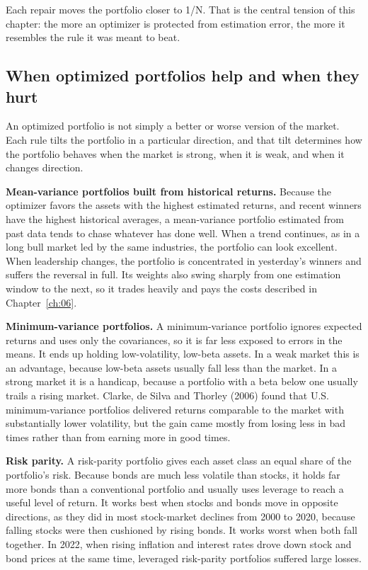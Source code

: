 Each repair moves the portfolio closer to 1/N. That is the central tension of this chapter: the more an optimizer is protected from estimation error, the more it resembles the rule it was meant to beat.

\subsection{When optimized portfolios help and when they hurt}
\label{sec:19-regimes}

An optimized portfolio is not simply a better or worse version of the market. Each rule tilts the portfolio in a particular direction, and that tilt determines how the portfolio behaves when the market is strong, when it is weak, and when it changes direction.

\textbf{Mean-variance portfolios built from historical returns.} Because the optimizer favors the assets with the highest estimated returns, and recent winners have the highest historical averages, a mean-variance portfolio estimated from past data tends to chase whatever has done well. When a trend continues, as in a long bull market led by the same industries, the portfolio can look excellent. When leadership changes, the portfolio is concentrated in yesterday's winners and suffers the reversal in full. Its weights also swing sharply from one estimation window to the next, so it trades heavily and pays the costs described in Chapter~\ref{ch:06}.

\textbf{Minimum-variance portfolios.} A minimum-variance portfolio ignores expected returns and uses only the covariances, so it is far less exposed to errors in the means. It ends up holding low-volatility, low-beta assets. In a weak market this is an advantage, because low-beta assets usually fall less than the market. In a strong market it is a handicap, because a portfolio with a beta below one usually trails a rising market. Clarke, de Silva and Thorley (2006) found that U.S. minimum-variance portfolios delivered returns comparable to the market with substantially lower volatility, but the gain came mostly from losing less in bad times rather than from earning more in good times.

\textbf{Risk parity.} A risk-parity portfolio gives each asset class an equal share of the portfolio's risk. Because bonds are much less volatile than stocks, it holds far more bonds than a conventional portfolio and usually uses leverage to reach a useful level of return. It works best when stocks and bonds move in opposite directions, as they did in most stock-market declines from 2000 to 2020, because falling stocks were then cushioned by rising bonds. It works worst when both fall together. In 2022, when rising inflation and interest rates drove down stock and bond prices at the same time, leveraged risk-parity portfolios suffered large losses.

